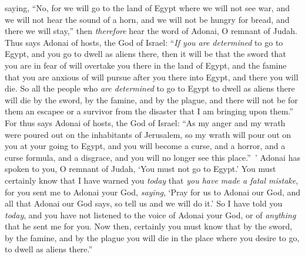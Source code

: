 \begin{biblechapter}
\verse saying, “No, for we will go to the land of Egypt where we will not see war, and we will not hear the sound of a horn, and we will not be hungry for bread, and there we will stay,”
\verse then \textit{therefore} hear the word of Adonai, O remnant of Judah. Thus says Adonai of hosts, the God of Israel: “\textit{If you are determined} to go to Egypt, and you go to dwell as aliens there,
\verse then it will be that the sword that you are in fear of will overtake you there in the land of Egypt, and the famine that you are anxious of will pursue after you there into Egypt, and there you will die.
\verse So all the people who \textit{are determined} to go to Egypt to dwell as aliens there will die by the sword, by the famine, and by the plague, and there will not be for them an escapee or a survivor from the disaster that I am bringing upon them.”
\verse For thus says Adonai of hosts, the God of Israel: “As my anger and my wrath were poured out on the inhabitants of Jerusalem, so my wrath will pour out on you at your going to Egypt, and you will become a curse, and a horror, and a curse formula, and a disgrace, and you will no longer see this place.” ’
\verse Adonai has spoken to you, O remnant of Judah, ‘You must not go to Egypt.’ You must certainly know that I have warned you \textit{today}
\verse that \textit{you have made a fatal mistake}, for you sent me to Adonai your God, \textit{saying}, ‘Pray for us to Adonai our God, and all that Adonai our God says, so tell us and we will do it.’
\verse So I have told you \textit{today}, and you have not listened to the voice of Adonai your God, or of \textit{anything} that he sent me for you.
\verse Now then, certainly you must know that by the sword, by the famine, and by the plague you will die in the place where you desire to go, to dwell as aliens there.”
\end{biblechapter}

